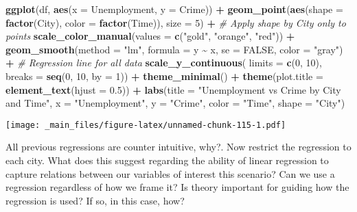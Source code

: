 \documentclass[
]{book}
\newenvironment{Shaded}{\begin{snugshade}}{\end{snugshade}}
\newcommand{\AttributeTok}[1]{\textcolor[rgb]{0.13,0.29,0.53}{#1}}
\newcommand{\CommentTok}[1]{\textcolor[rgb]{0.56,0.35,0.01}{\textit{#1}}}
\newcommand{\ConstantTok}[1]{\textcolor[rgb]{0.56,0.35,0.01}{#1}}
\newcommand{\DecValTok}[1]{\textcolor[rgb]{0.00,0.00,0.81}{#1}}
\newcommand{\FloatTok}[1]{\textcolor[rgb]{0.00,0.00,0.81}{#1}}
\newcommand{\FunctionTok}[1]{\textcolor[rgb]{0.13,0.29,0.53}{\textbf{#1}}}
\newcommand{\NormalTok}[1]{#1}
\newcommand{\SpecialCharTok}[1]{\textcolor[rgb]{0.81,0.36,0.00}{\textbf{#1}}}
\newcommand{\StringTok}[1]{\textcolor[rgb]{0.31,0.60,0.02}{#1}}
\begin{document}
\begin{Shaded}
\begin{Highlighting}[]
\FunctionTok{ggplot}\NormalTok{(df, }\FunctionTok{aes}\NormalTok{(}\AttributeTok{x =}\NormalTok{ Unemployment, }\AttributeTok{y =}\NormalTok{ Crime)) }\SpecialCharTok{+}
  \FunctionTok{geom\_point}\NormalTok{(}\FunctionTok{aes}\NormalTok{(}\AttributeTok{shape =} \FunctionTok{factor}\NormalTok{(City), }\AttributeTok{color =} \FunctionTok{factor}\NormalTok{(Time)), }\AttributeTok{size =} \DecValTok{5}\NormalTok{) }\SpecialCharTok{+}  \CommentTok{\# Apply shape by City only to points}
  \FunctionTok{scale\_color\_manual}\NormalTok{(}\AttributeTok{values =} \FunctionTok{c}\NormalTok{(}\StringTok{"gold"}\NormalTok{, }\StringTok{"orange"}\NormalTok{, }\StringTok{"red"}\NormalTok{)) }\SpecialCharTok{+}
  \FunctionTok{geom\_smooth}\NormalTok{(}\AttributeTok{method =} \StringTok{"lm"}\NormalTok{, }\AttributeTok{formula =}\NormalTok{ y }\SpecialCharTok{\textasciitilde{}}\NormalTok{ x, }\AttributeTok{se =} \ConstantTok{FALSE}\NormalTok{, }\AttributeTok{color =} \StringTok{"gray"}\NormalTok{) }\SpecialCharTok{+}  \CommentTok{\# Regression line for all data}
  \FunctionTok{scale\_y\_continuous}\NormalTok{(}
    \AttributeTok{limits =} \FunctionTok{c}\NormalTok{(}\DecValTok{0}\NormalTok{, }\DecValTok{10}\NormalTok{),}
    \AttributeTok{breaks =} \FunctionTok{seq}\NormalTok{(}\DecValTok{0}\NormalTok{, }\DecValTok{10}\NormalTok{, }\AttributeTok{by =} \DecValTok{1}\NormalTok{)) }\SpecialCharTok{+}
  \FunctionTok{theme\_minimal}\NormalTok{() }\SpecialCharTok{+}
  \FunctionTok{theme}\NormalTok{(}\AttributeTok{plot.title =} \FunctionTok{element\_text}\NormalTok{(}\AttributeTok{hjust =} \FloatTok{0.5}\NormalTok{)) }\SpecialCharTok{+}
  \FunctionTok{labs}\NormalTok{(}\AttributeTok{title =} \StringTok{"Unemployment vs Crime by City and Time"}\NormalTok{,}
       \AttributeTok{x =} \StringTok{"Unemployment"}\NormalTok{,}
       \AttributeTok{y =} \StringTok{"Crime"}\NormalTok{,}
       \AttributeTok{color =} \StringTok{"Time"}\NormalTok{,}
       \AttributeTok{shape =} \StringTok{"City"}\NormalTok{)}
\end{Highlighting}
\end{Shaded}

\texttt{[image: \_main\_files/figure-latex/unnamed-chunk-115-1.pdf]}

All previous regressions are counter intuitive, why?. Now restrict the regression to each city. What does this suggest regarding the ability of linear regression to capture relations between our variables of interest this scenario? Can we use a regression regardless of how we frame it? Is theory important for guiding how the regression is used? If so, in this case, how?
\end{document}
